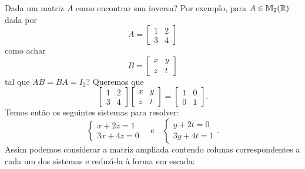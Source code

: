 Dada um matriz $A$ como encontrar sua inversa? Por exemplo, para $A \in \mathbb{M}_2(\mathbb{R})$ dada por
\[
	A =
	\begin{bmatrix}
		1 & 2\\
		3 & 4
	\end{bmatrix}
\]
como achar
\[
	B =
	\begin{bmatrix}
		x & y\\
		z & t
	\end{bmatrix}
\]
tal que $AB = BA = I_2$? Queremos que
\[
	\begin{bmatrix}
		1 & 2\\
		3 & 4
	\end{bmatrix}
	\begin{bmatrix}
		x & y\\
		z & t
	\end{bmatrix} =
	\begin{bmatrix}
		1 & 0\\
		0 & 1
	\end{bmatrix}.
\]
Temos ent\~ao os seguintes sistemas para resolver:
\[
	\begin{cases}
		x + 2z = 1\\
		3x + 4z = 0
	\end{cases} \quad \mbox{e}\quad
	\begin{cases}
		y + 2t = 0\\
		3y + 4t = 1
	\end{cases}.
\]
Assim podemos considerar a matriz ampliada contendo colunas correspondentes a cada um dos sistemas e reduz{\'\i}-la \`a forma em escada:
